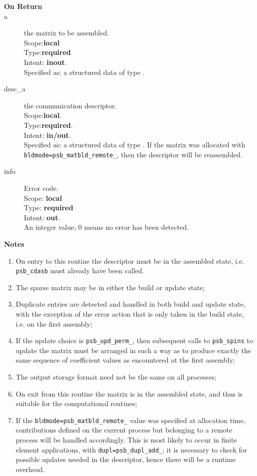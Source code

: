 \begin{description}
\item[\bf On Return]
\item[a] the matrix to be assembled.\\
Scope:{\bf local}\\
Type:{\bf required}\\
Intent: {\bf inout}.\\
Specified as: a structured data of type \spdata.
\item[desc\_a] the communication descriptor.\\
Scope:{\bf local}.\\
Type:{\bf required}.\\
Intent: {\bf in/out}.\\
Specified as: a structured data of type \descdata. If the matrix was
allocated with \verb|bldmode=psb_matbld_remote_|, then the
descriptor will be reassembled. 
\item[info] Error code.\\
Scope: {\bf local} \\
Type: {\bf required} \\
Intent: {\bf out}.\\
An integer value; 0 means no error has been detected. 
\end{description}

{\par\noindent\large\bfseries Notes}
\begin{enumerate}
\item On entry to this routine the descriptor must  be in  the
  assembled state, i.e. \verb|psb_cdasb| must already have been called.
\item The sparse matrix may be in either the build or update state;
\item Duplicate entries are detected and handled in both build and
  update state, with the exception of the error action that is only
  taken in the build state, i.e. on the first assembly; 
\item If the update choice is \verb|psb_upd_perm_|, then subsequent
  calls to \verb|psb_spins| to update the matrix must be arranged in
  such a way as to produce exactly the same sequence of coefficient
  values as encountered at the first assembly; 
\item The output storage format need not be the same on all
  processes; 
\item On exit from this routine the matrix is in the assembled state,
  and thus is suitable for the computational routines;
\item If the \verb|bldmode=psb_matbld_remote_| value was specified
  at allocation time, contributions defined on the current process but
  belonging to a remote process will be handled accordingly. This is
  most likely to occur in finite element applications, with
  \verb|dupl=psb_dupl_add_|; it is necessary to check for possible
  updates needed in the descriptor, hence there will be a runtime
  overhead.  
\end{enumerate}



